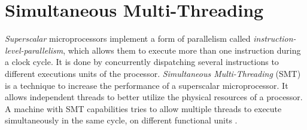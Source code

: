 
\section{Simultaneous Multi-Threading}
\label{sec:simultaneousMultiThreading}
\textit{Superscalar} microprocessors implement a form of parallelism called \textit{instruction-level-parallelism}, which allows them to execute more than one instruction during a clock cycle. It is done by concurrently dispatching several instructions to different executions units of the processor. \textit{Simultaneous Multi-Threading} (SMT) is a technique to increase the performance of a superscalar microprocessor. It allows independent threads to better utilize the physical resources of a processor. A machine with SMT capabilities tries to allow multiple threads to execute simultaneously in the same cycle, on different functional units \cite{reinhardt2000detectionSimultaneousMultithreading}. 

